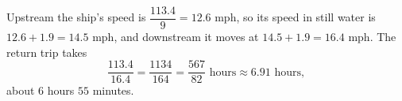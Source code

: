 Upstream the ship's speed is $\dfrac{113.4}{9}=12.6$ mph, so its speed in still water is $12.6+1.9=14.5$ mph, and downstream it moves at $14.5+1.9=16.4$ mph. The return trip takes
\[
\dfrac{113.4}{16.4}=\dfrac{1134}{164}=\boxed{\dfrac{567}{82}\text{ hours}}\approx6.91\text{ hours},
\]
about $6$ hours $55$ minutes.
